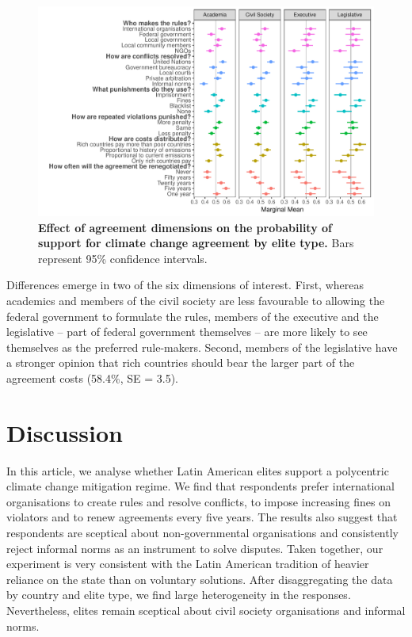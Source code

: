 \documentclass[a4paper,12pt]{article}
\begin{document}
\begin{figure}[H]
	\centering
	\includegraphics[width=\linewidth]{types.pdf}
	\caption{\textbf{Effect of agreement dimensions on the probability of support for climate change agreement by elite type.} Bars represent 95\% confidence intervals.}
	\label{fig:types}
\end{figure}

Differences emerge in two of the six dimensions of interest. First, whereas academics and members of the civil society are less favourable to allowing the federal government to formulate the rules, members of the executive and the legislative -- part of federal government themselves -- are more likely to see themselves as the preferred rule-makers. Second, members of the legislative have a stronger opinion that rich countries should bear the larger part of the agreement costs (58.4\%, SE = 3.5). 

\section*{Discussion}
\label{sec:discussion}

In this article, we analyse whether Latin American elites support a polycentric climate change mitigation regime. We find that respondents prefer international organisations to create rules and resolve conflicts, to impose increasing fines on violators and to renew agreements every five years.  The results also suggest that respondents are sceptical about non-governmental organisations and consistently reject informal norms as an instrument to solve disputes. Taken together, our experiment is very consistent with the Latin American tradition of heavier reliance on the state than on voluntary solutions. After disaggregating the data by country and elite type, we find large heterogeneity in the responses. Nevertheless, elites remain sceptical about civil society organisations and informal norms. 
\end{document}
